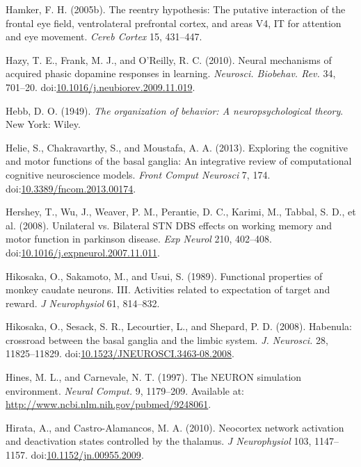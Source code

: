 \documentclass[
  11pt,
  a4paper,
]{scrbook}
\newlength{\cslhangindent}
\newenvironment{CSLReferences}[2] %
 {\begin{list}{}{%
  \setlength{\itemindent}{0pt}
  \setlength{\leftmargin}{0pt}
  \setlength{\parsep}{0pt}
  \ifodd #1
   \setlength{\leftmargin}{\cslhangindent}
   \setlength{\itemindent}{-1\cslhangindent}
  \fi
  \setlength{\itemsep}{#2\baselineskip}}}
 {\end{list}}
\begin{document}
\begin{CSLReferences}{1}{1}
Hamker, F. H. (2005b). The reentry hypothesis: The putative interaction
of the frontal eye field, ventrolateral prefrontal cortex, and areas
{V4}, {IT} for attention and eye movement. \emph{Cereb Cortex} 15,
431--447.

Hazy, T. E., Frank, M. J., and O'Reilly, R. C. (2010). {Neural
mechanisms of acquired phasic dopamine responses in learning.}
\emph{Neurosci. Biobehav. Rev.} 34, 701--20.
doi:\href{https://doi.org/10.1016/j.neubiorev.2009.11.019}{10.1016/j.neubiorev.2009.11.019}.

Hebb, D. O. (1949). \emph{{The organization of behavior: A
neuropsychological theory}}. New York: Wiley.

Helie, S., Chakravarthy, S., and Moustafa, A. A. (2013). Exploring the
cognitive and motor functions of the basal ganglia: An integrative
review of computational cognitive neuroscience models. \emph{Front
Comput Neurosci} 7, 174.
doi:\href{https://doi.org/10.3389/fncom.2013.00174}{10.3389/fncom.2013.00174}.

Hershey, T., Wu, J., Weaver, P. M., Perantie, D. C., Karimi, M., Tabbal,
S. D., et al. (2008). Unilateral vs. Bilateral STN DBS effects on
working memory and motor function in parkinson disease. \emph{Exp
Neurol} 210, 402--408.
doi:\href{https://doi.org/10.1016/j.expneurol.2007.11.011}{10.1016/j.expneurol.2007.11.011}.

Hikosaka, O., Sakamoto, M., and Usui, S. (1989). Functional properties
of monkey caudate neurons. {III.} {A}ctivities related to expectation of
target and reward. \emph{J Neurophysiol} 61, 814--832.

Hikosaka, O., Sesack, S. R., Lecourtier, L., and Shepard, P. D. (2008).
{Habenula: crossroad between the basal ganglia and the limbic system.}
\emph{J. Neurosci.} 28, 11825--11829.
doi:\href{https://doi.org/10.1523/JNEUROSCI.3463-08.2008}{10.1523/JNEUROSCI.3463-08.2008}.

Hines, M. L., and Carnevale, N. T. (1997). {The NEURON simulation
environment.} \emph{Neural Comput.} 9, 1179--209. Available at:
\url{http://www.ncbi.nlm.nih.gov/pubmed/9248061}.

Hirata, A., and Castro-Alamancos, M. A. (2010). Neocortex network
activation and deactivation states controlled by the thalamus. \emph{J
Neurophysiol} 103, 1147--1157.
doi:\href{https://doi.org/10.1152/jn.00955.2009}{10.1152/jn.00955.2009}.


\end{CSLReferences}
\end{document}
